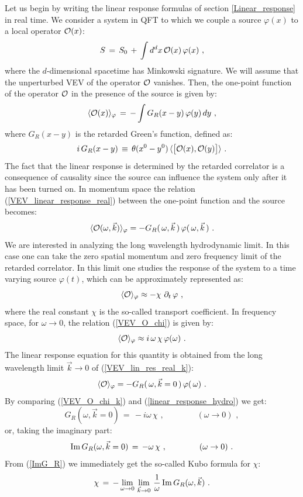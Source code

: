 \documentclass[12pt,notitlepage,a4paper]{article}
\newcommand{\beq}{\begin{equation}}
\newcommand{\eeq}{\end{equation}}
\begin{document}
Let us  begin by writing the linear response formulas of section \ref{Linear_response} in real time. We consider a system in QFT to which we couple a source $\varphi(x)$ to a local operator ${\cal O}(x)$:
\beq
S\,=\,S_0\,+\,\int d^dx \,{\cal O}(x)\,\varphi(x)\,\,,
\eeq
where the $d$-dimensional spacetime has Minkowski signature.  We will assume that the unperturbed VEV of the operator ${\cal O}$ vanishes. Then, the one-point function of the operator ${\cal O}$ in the presence of the source is given by:
\beq
\langle {\cal O} (x)\rangle_{\varphi} \,=\,-\int G_{R} (x-y)\,\varphi(y)\,dy\,\,,
\label{VEV_linear_response_real}
\eeq
where $G_{R} (x-y)$ is the retarded Green's function, defined as:
\beq
i\,G_{R} (x-y)\,\equiv\,\theta(x^0-y^0)\,\langle \big[
{\cal O}(x), {\cal O}(y)\big]\rangle\,\,.
\eeq
The fact that the  linear response is determined by the retarded correlator is a consequence of causality since  the source can influence the system only after it has been turned on. In momentum space the relation (\ref{VEV_linear_response_real}) between  the one-point function and the source becomes:
\beq
\langle {\cal O} (\omega, \vec k)\rangle_{\varphi} =
-G_R(\,\omega, \vec k\,) \,\varphi (\,\omega, \vec k\,) \,\,.
\label{VEV_lin_res_real_k}
\eeq
We are interested in analyzing the long wavelength hydrodynamic limit. In this case one can take the zero spatial momentum and zero frequency limit of the retarded correlator. 
In this limit one studies the response of the system to a time varying source $\varphi(t)$, which can be approximately represented as:
\beq
\langle {\cal O} \rangle_{\varphi} \approx -\chi\,\, \partial_t\,\varphi\,\,,
\label{VEV_O_chi}
\eeq
where  the real constant $\chi$ is the so-called transport coefficient. In frequency space, for $\omega\to 0$,  the relation  (\ref{VEV_O_chi}) is given by:
\beq
\langle {\cal O} \rangle_{\varphi} \approx  i \,\omega\, \chi\,\varphi (\omega)\,\,.
\label{VEV_O_chi_k}
\eeq
The linear response equation for this quantity is obtained from the long wavelength limit $\vec k\to 0$ of (\ref{VEV_lin_res_real_k}):
\beq
\langle {\cal O}\rangle_{\varphi} =
-G_R(\,\omega, \vec k =0\,) \,\varphi (\,\omega)\,\,.
\label{linear_response_hydro}
\eeq
By comparing (\ref{VEV_O_chi_k}) and (\ref{linear_response_hydro}) we get:
\beq
G_R(\omega, \vec k=0)\,=\,-i\omega\,\chi\,\,,
\qquad\qquad (\omega\to 0)\,\,,
\eeq
or, taking the imaginary part:
\beq
{\rm Im}\, G_R(\omega, \vec k=0)\,=\,-\omega\,\chi\,\,,
\qquad\qquad (\omega\to 0)\,\,.
\label{ImG_R}
\eeq
From (\ref{ImG_R}) we immediately get the so-called  Kubo formula for $\chi$:
\beq
\chi\,=\,-\lim_{\omega\to 0}\,\lim_{\vec k\to 0}\, {1\over \omega}\,
{\rm Im}\, G_R(\omega, \vec k)\,\,.
\label{Kubo}
\eeq
\end{document}
